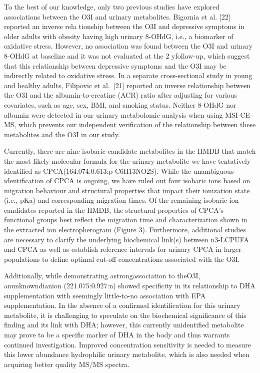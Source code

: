 \documentclass[journal=jacsat,manuscript=article]{achemso}
\begin{document}
To the best of our knowledge, only two previous studies have explored
associations between the O3I and urinary metabolites. Bigornia et al.
{[}22{]} reported an inverse rela tionship between the O3I and
depressive symptoms in older adults with obesity having high urinary
8-OHdG, i.e., a biomarker of oxidative stress. However, no association
was found between the O3I and urinary 8-OHdG at baseline and it was not
evaluated at the 2 yfollow-up, which suggest that this relationship
between depressive symptoms and the O3I may be indirectly related to
oxidative stress. In a separate cross-sectional study in young and
healthy adults, Filipovic et al.~{[}21{]} reported an inverse
relationship between the O3I and the albumin-to-creatine (ACR) ratio
after adjusting for various covariates, such as age, sex, BMI, and
smoking status. Neither 8-OHdG nor albumin were detected in our urinary
metabolomic analysis when using MSI-CE-MS, which prevents our
independent verification of the relationship between these metabolites
and the O3I in our study.

Currently, there are nine isobaric candidate metabolites in the HMDB
that match the most likely molecular formula for the urinary metabolite
we have tentatively identified as CPCA(164.074:0.613:p-C6H13NO2S). While
the unambiguous identification of CPCA is ongoing, we have ruled out
four isobaric ions based on migration behaviour and structural
properties that impact their ionization state (i.e., pKa) and
corresponding migration times. Of the remaining isobaric ion candidates
reported in the HMDB, the structural properties of CPCA's functional
groups best reflect the migration time and characterization shown in the
extracted ion electropherogram (Figure 3). Furthermore, additional
studies are necessary to clarify the underlying biochemical link(s)
between n3-LCPUFA and CPCA as well as establish reference intervals for
urinary CPCA in larger populations to define optimal cut-off
concentrations associated with the O3I.

Additionally, while demonstrating astrongassociation to theO3I,
anunknowndianion (221.075:0.927:n) showed specificity in its
relationship to DHA supplementation with seemingly little-to-no
association with EPA supplementation. In the absence of a confirmed
identification for this urinary metabolite, it is challenging to
speculate on the biochemical significance of this finding and its link
with DHA; however, this currently unidentified metabolite may prove to
be a specific marker of DHA in the body and thus warrants continued
investigation. Improved concentration sensitivity is needed to measure
this lower abundance hydrophilic urinary metabolite, which is also
needed when acquiring better quality MS/MS spectra.
\end{document}
